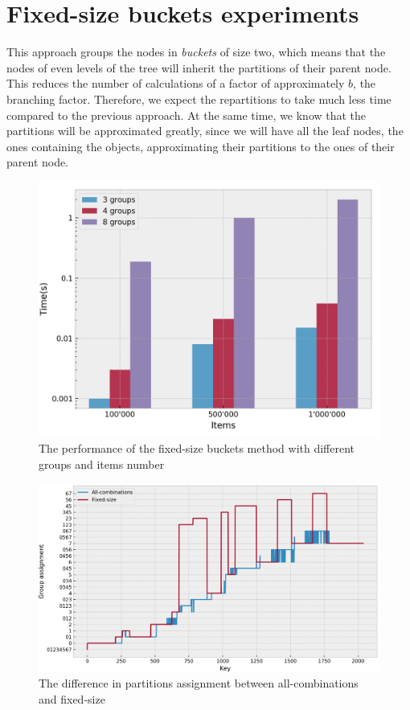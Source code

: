 \section{Fixed-size buckets experiments}\label{sec:fixed-size buckets-tests}
This approach groups the nodes in \emph{buckets} of size two, which means that the nodes of even levels of the tree will inherit the partitions of their parent node. This reduces the number of calculations of a factor of approximately $b$, the branching factor. Therefore, we expect the repartitions to take much less time compared to the previous approach. At the same time, we know that the partitions will be approximated greatly, since we will have all the leaf nodes, the ones containing the objects, approximating their partitions to the ones of their parent node.

\begin{figure}[!htb]
  \centering
  \includegraphics[width=\textwidth,height=\textheight,keepaspectratio]{img/fixed.png}
  \caption{The performance of the fixed-size buckets method with different groups and items number}
  \label{fig:fixed}
\end{figure}

\begin{figure}[!htb]
  \centering
  \includegraphics[width=\textwidth,height=\textheight,keepaspectratio]{img/partition_difference_fixed_all.png}
  \caption{The difference in partitions assignment between all-combinations and fixed-size}
  \label{fig:fixed-partitioning}
\end{figure}

